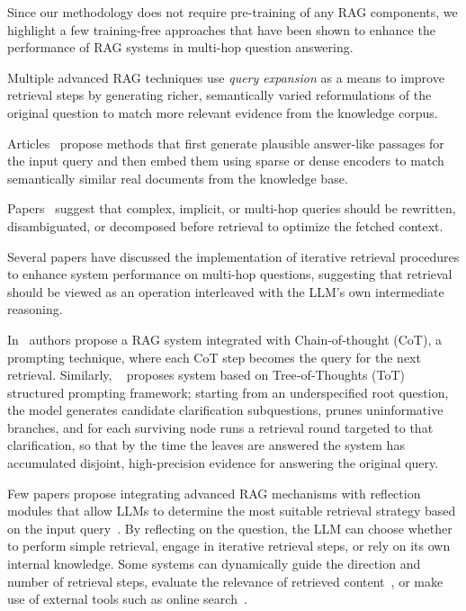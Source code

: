 \documentclass{article}
\begin{document}
Since our methodology does not require pre-training of any RAG components, we highlight a few training-free approaches that have been shown to enhance the performance of RAG systems in multi-hop question answering.

Multiple advanced RAG techniques use \textit{query expansion} as a means to improve retrieval steps by generating richer, semantically varied reformulations of the original question to match more relevant evidence from the knowledge corpus.

Articles~\cite{wang2023query2doc, gao2023precise} propose methods that first generate plausible answer-like passages for the input query and then embed them using sparse or dense encoders to match semantically similar real documents from the knowledge base.

Papers~\cite{ma2023query, fu2021decomposing} suggest that complex, implicit, or multi-hop queries should be rewritten, disambiguated, or decomposed before retrieval to optimize the fetched context.

Several papers have discussed the implementation of iterative retrieval procedures to enhance system performance on multi-hop questions, suggesting that retrieval should be viewed as an operation interleaved with the LLM’s own intermediate reasoning.

In~\cite{trivedi2022interleaving} authors propose a RAG system integrated with Chain‑of‑thought (CoT), a prompting technique, where each CoT step becomes the query for the next retrieval. Similarly, ~\cite{kim2023tree} proposes system based on Tree‑of‑Thoughts (ToT) structured prompting framework; starting from an underspecified root question, the model generates candidate clarification subquestions, prunes uninformative branches, and for each surviving node runs a retrieval round targeted to that clarification, so that by the time the leaves are answered the system has accumulated disjoint, high-precision evidence for answering the original query.

Few papers propose integrating advanced RAG mechanisms with reflection modules that allow LLMs to determine the most suitable retrieval strategy based on the input query~\cite{jeong2024adaptive, wang2023self, asai2024self, crag}. By reflecting on the question, the LLM can choose whether to perform simple retrieval, engage in iterative retrieval steps, or rely on its own internal knowledge. Some systems can dynamically guide the direction and number of retrieval steps, evaluate the relevance of retrieved content~\cite{asai2024self}, or make use of external tools such as online search~\cite{crag}.
\end{document}
